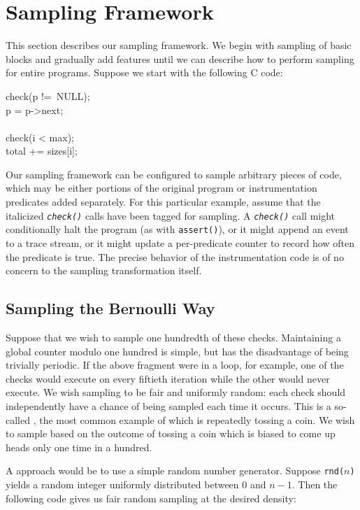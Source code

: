 \section{Sampling Framework}
\label{sec:framework}

This section describes our sampling framework.  We begin with sampling
of basic blocks and gradually add features until we can describe how
to perform sampling for entire programs.  Suppose we start with the
following C code:

\begin{code}
  check(p !=\ NULL); \\
  \up p = p->next; \\
  \\
  check(i < max); \\
  \up total += sizes[i];
\end{code}

Our sampling framework can be configured to sample arbitrary pieces of
code, which may be either portions of the original program or
instrumentation predicates added separately.  For this particular
example, assume that the italicized \texttt{\textit{check()}} calls
have been tagged for sampling.  A \texttt{\textit{check()}} call might
conditionally halt the program (as with \texttt{assert()}), or it
might append an event to a trace stream, or it might update a
per-predicate counter to record how often the predicate is true.  The
precise behavior of the instrumentation code is of no concern to the
sampling transformation itself.

\subsection{Sampling the Bernoulli Way}

Suppose that we wish to sample one hundredth of these checks.
Maintaining a global counter modulo one hundred is simple, but has the
disadvantage of being trivially periodic.  If the above fragment were
in a loop, for example, one of the checks would execute on every
fiftieth iteration while the other would never execute.  We wish
sampling to be fair and uniformly random: each check should
independently have a  chance of being sampled each
time it occurs.  This is a so-called , the
most common example of which is repeatedly tossing a coin.  We wish to
sample based on the outcome of tossing a coin which is biased to come
up heads only one time in a hundred.

A \naive approach would be to use a simple random number generator.
Suppose \texttt{rnd($n$)} yields a random integer uniformly
distributed between 0 and $n-1$.  Then the following code gives us
fair random sampling at the desired density:

